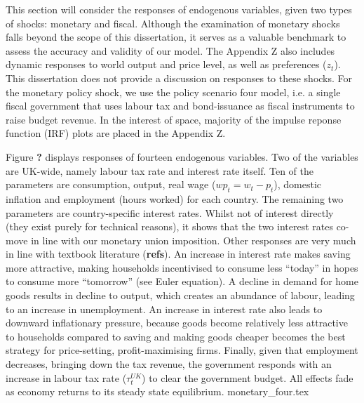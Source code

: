 This section will consider the responses of endogenous variables, given two types of shocks: monetary and fiscal. Although the examination of monetary shocks falls beyond the scope of this dissertation, it serves as a valuable benchmark to assess the accuracy and validity of our model. The Appendix Z also includes dynamic responses to world output and price level, as well as preferences ($z_t$). This dissertation does not provide a discussion on responses to these shocks. For the monetary policy shock, we use the policy scenario four model, i.e. a single fiscal government that uses labour tax and bond-issuance as fiscal instruments to raise budget revenue. In the interest of space, majority of the impulse reponse function (IRF) plots are placed in the Appendix Z. 

Figure \textbf{?} displays responses of fourteen endogenous variables. Two of the variables are UK-wide, namely labour tax rate and interest rate itself. Ten of the parameters are consumption, output, real wage ($wp_t = w_t - p_t$), domestic inflation and employment (hours worked) for each country. The remaining two parameters are country-specific interest rates. Whilst not of interest directly (they exist purely for technical reasons), it shows that the two interest rates co-move in line with our monetary union imposition. Other responses are very much in line with textbook literature (\textbf{refs}). An increase in interest rate makes saving more attractive, making households incentivised to consume less ``today'' in hopes to consume more ``tomorrow'' (see Euler equation). A decline in demand for home goods results in decline to output, which creates an abundance of labour, leading to an increase in unemployment. An increase in interest rate also leads to downward inflationary pressure, because goods become relatively less attractive to households compared to saving and making goods cheaper becomes the best strategy for price-setting, profit-maximising firms. Finally, given that employment decreases, bringing down the tax revenue, the government responds with an increase in labour tax rate ($\tau^{UK}_t$) to clear the government budget. All effects fade as economy returns to its steady state equilibrium.
{monetary_four.tex}

